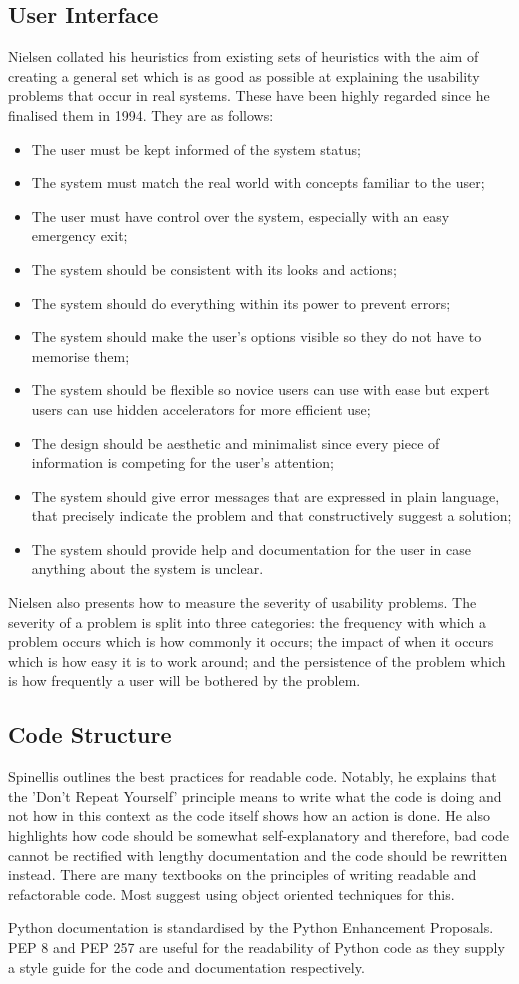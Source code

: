 		\subsection{User Interface}
			Nielsen collated his heuristics from existing sets of heuristics with the aim of creating a general set which is as good as possible at explaining the usability problems that occur in real systems\cite{usability_heuristics_nielsen}. These have been highly regarded since he finalised them in 1994. They are as follows: 
			\begin{itemize}
				\item The user must be kept informed of the system status;
				\item The system must match the real world with concepts familiar to the user;  
				\item The user must have control over the system, especially with an easy emergency exit; 
				\item The system should be consistent with its looks and actions;
				\item The system should do everything within its power to prevent errors;
				\item The system should make the user's options visible so they do not have to memorise them;
				\item The system should be flexible so novice users can use with ease but expert users can use hidden accelerators for more efficient use;
				\item The design should be aesthetic and minimalist since every piece of information is competing for the user's attention;
				\item The system should give error messages that are expressed in plain language, that precisely indicate the problem and that constructively suggest a solution;
				\item The system should provide help and documentation for the user in case anything about the system is unclear. 
			\end{itemize}

			Nielsen also presents how to measure the severity of usability problems. The severity of a problem is split into three categories: the frequency with which a problem occurs which is how commonly it occurs; the impact of when it occurs which is how easy it is to work around; and the persistence of the problem which is how frequently a user will be bothered by the problem. 
		\subsection{Code Structure}
			Spinellis outlines the best practices for readable code\cite{code_documentation_spinellis}. Notably, he explains that the 'Don't Repeat Yourself' principle means to write what the code is doing and not how in this context as the code itself shows how an action is done. He also highlights how code should be somewhat self-explanatory and therefore, bad code cannot be rectified with lengthy documentation and the code should be rewritten instead. There are many textbooks on the principles of writing readable and refactorable code. Most suggest using object oriented techniques for this\cite{software_craftsmanship_martin}.  

			Python documentation is standardised by the Python Enhancement Proposals. PEP 8 and PEP 257 are useful for the readability of Python code as they supply a style guide for the code and documentation respectively\cite{pep_guido}. 